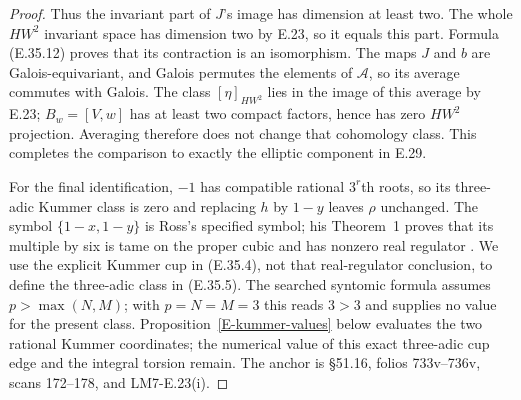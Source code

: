 \begin{proof}
Thus the invariant part of $J$'s image has
dimension at least two. The whole $HW^2$
invariant space has dimension two by E.23,
so it equals this part. Formula (E.35.12)
proves that its contraction is an isomorphism.
The maps $J$ and $b$ are Galois-equivariant,
and Galois permutes the elements of
$\mathcal A$, so its average commutes with
Galois. The class $[\eta]_{HW^2}$ lies in the
image of this average by E.23; $B_w=[V,w]$
has at least two compact factors, hence has
zero $HW^2$ projection. Averaging therefore
does not change that cohomology class. This
completes the comparison to exactly the
elliptic component in E.29.

For the final identification, $-1$ has
compatible rational $3^r$th roots, so its
three-adic Kummer class is zero and replacing
$h$ by $1-y$ leaves $\rho$ unchanged.
The symbol $\{1-x,1-y\}$ is Ross's specified
symbol; his Theorem~1 proves that its multiple
by six is tame on the proper cubic and has
nonzero real regulator \cite{Ross1994}.
We use the explicit Kummer cup in (E.35.4),
not that real-regulator conclusion, to define
the three-adic class in (E.35.5).
The searched syntomic formula
\cite[Theorem 4.11]{Asakura2023} assumes
$p>\max(N,M)$; with $p=N=M=3$ this reads
$3>3$ and supplies no value for the present
class. Proposition~\ref{E-kummer-values} below
evaluates the two rational Kummer coordinates;
the numerical value of this exact three-adic
cup edge and the integral torsion remain.
The anchor is \S51.16,
folios 733v--736v, scans 172--178, and
LM7-E.23(i).
\end{proof}
